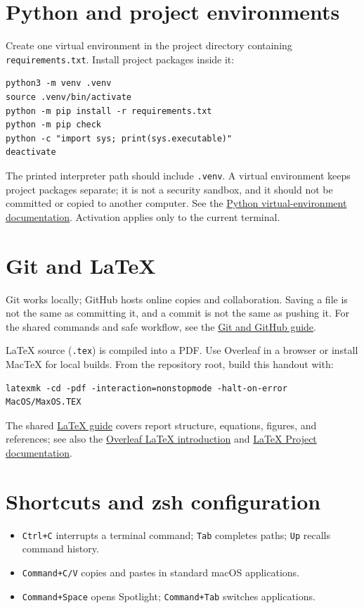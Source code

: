 \documentclass[11pt]{article}
\begin{document}
\section{Python and project environments}
Create one virtual environment in the project directory containing
\texttt{requirements.txt}. Install project packages inside it:
\begin{lstlisting}
python3 -m venv .venv
source .venv/bin/activate
python -m pip install -r requirements.txt
python -m pip check
python -c "import sys; print(sys.executable)"
deactivate
\end{lstlisting}
The printed interpreter path should include \texttt{.venv}. A virtual
environment keeps project packages separate; it is not a security sandbox,
and it should not be committed or copied to another computer. See the
\href{https://docs.python.org/3/library/venv.html}{Python virtual-environment
documentation}. Activation applies only to the current terminal.

\section{Git and LaTeX}
Git works locally; GitHub hosts online copies and collaboration. Saving a file
is not the same as committing it, and a commit is not the same as pushing it.
For the shared commands and safe workflow, see the
\href{../Git/Git.pdf}{Git and GitHub guide}.

LaTeX source (\texttt{.tex}) is compiled into a PDF. Use Overleaf in a browser
or install MacTeX for local builds. From the repository root, build this
handout with:
\begin{lstlisting}
latexmk -cd -pdf -interaction=nonstopmode -halt-on-error MacOS/MaxOS.TEX
\end{lstlisting}
The shared \href{../LaTeX/LaTeX.pdf}{LaTeX guide} covers report structure,
equations, figures, and references; see also the
\href{https://www.overleaf.com/learn/latex/Learn_LaTeX_in_30_minutes}{Overleaf
LaTeX introduction} and
\href{https://www.latex-project.org/help/documentation/}{LaTeX Project
documentation}.

\section{Shortcuts and zsh configuration}
\begin{itemize}
\item \texttt{Ctrl+C} interrupts a terminal command; \texttt{Tab} completes
paths; \texttt{Up} recalls command history.
\item \texttt{Command+C/V} copies and pastes in standard macOS applications.
\item \texttt{Command+Space} opens Spotlight; \texttt{Command+Tab} switches
applications.
\end{itemize}
\end{document}
